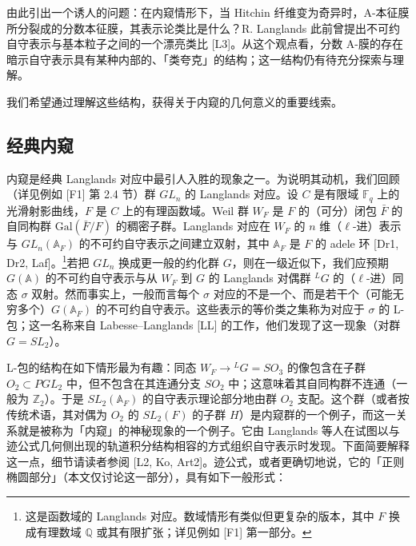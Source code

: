 由此引出一个诱人的问题：在内窥情形下，当 Hitchin 纤维变为奇异时，A-本征膜所分裂成的分数本征膜，其表示论类比是什么？R. Langlands 此前曾提出不可约自守表示与基本粒子之间的一个漂亮类比 [L3]。从这个观点看，分数 A-膜的存在暗示自守表示具有某种内部的、「类夸克」的结构；这一结构仍有待充分探索与理解。

我们希望通过理解这些结构，获得关于内窥的几何意义的重要线索。

\subsection{经典内窥}

内窥是经典 Langlands 对应中最引人入胜的现象之一。为说明其动机，我们回顾（详见例如 [F1] 第 2.4 节）群 $GL_n$ 的 Langlands 对应。设 $C$ 是有限域 $\mathbb{F}_q$ 上的光滑射影曲线，$F$ 是 $C$ 上的有理函数域。Weil 群 $W_F$ 是 $F$ 的（可分）闭包 $\bar F$ 的自同构群 $\mathrm{Gal}(\bar F/F)$ 的稠密子群。Langlands 对应在 $W_F$ 的 $n$ 维（$\ell$-进）表示与 $GL_n(\mathbb{A}_F)$ 的不可约自守表示之间建立双射，其中 $\mathbb{A}_F$ 是 $F$ 的 adele 环 [Dr1, Dr2, Laf]。\footnote{这是函数域的 Langlands 对应。数域情形有类似但更复杂的版本，其中 $F$ 换成有理数域 $\mathbb{Q}$ 或其有限扩张；详见例如 [F1] 第一部分。}若把 $GL_n$ 换成更一般的约化群 $G$，则在一级近似下，我们应预期 $G(\mathbb{A})$ 的不可约自守表示与从 $W_F$ 到 $G$ 的 Langlands 对偶群 ${}^{L}G$ 的（$\ell$-进）同态 $\sigma$ 双射。然而事实上，一般而言每个 $\sigma$ 对应的不是一个、而是若干个（可能无穷多个）$G(\mathbb{A}_F)$ 的不可约自守表示。这些表示的等价类之集称为对应于 $\sigma$ 的 L-包；这一名称来自 Labesse--Langlands [LL] 的工作，他们发现了这一现象（对群 $G=SL_2$）。

L-包的结构在如下情形最为有趣：同态 $W_F\to{}^{L}G=SO_3$ 的像包含在子群 $O_2\subset PGL_2$ 中，但不包含在其连通分支 $SO_2$ 中；这意味着其自同构群不连通（一般为 $\mathbb{Z}_2$）。于是 $SL_2(\mathbb{A}_F)$ 的自守表示理论部分地由群 $O_2$ 支配。这个群（或者按传统术语，其对偶为 $O_2$ 的 $SL_2(F)$ 的子群 $H$）是内窥群的一个例子，而这一关系就是被称为「内窥」的神秘现象的一个例子。它由 Langlands 等人在试图以与迹公式几何侧出现的轨道积分结构相容的方式组织自守表示时发现。下面简要解释这一点，细节请读者参阅 [L2, Ko, Art2]。迹公式，或者更确切地说，它的「正则椭圆部分」（本文仅讨论这一部分），具有如下一般形式：


